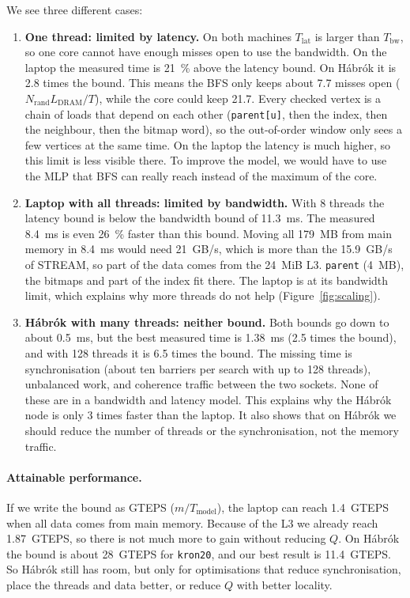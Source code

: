 We see three different cases:
\begin{enumerate}
  \item \textbf{One thread: limited by latency.} On both machines $T_\text{lat}$ is larger than
        $T_\text{bw}$, so one core cannot have enough misses open to use the bandwidth. On
        the laptop the measured time is \SI{21}{\percent} above the latency bound. On Hábrók it
        is 2.8 times the bound. This means the BFS only keeps about 7.7 misses open
        ($N_\text{rand} L_\text{DRAM} / T$), while the core could keep 21.7. Every checked
        vertex is a chain of loads that depend on each other (\texttt{parent[u]}, then the
        index, then the neighbour, then the bitmap word), so the out-of-order window only sees
        a few vertices at the same time. On the laptop the latency is much higher, so this
        limit is less visible there. To improve the model, we would have to use the MLP that
        BFS can really reach instead of the maximum of the core.
  \item \textbf{Laptop with all threads: limited by bandwidth.} With 8 threads the latency
        bound is below the bandwidth bound of \SI{11.3}{ms}. The measured \SI{8.4}{ms} is even
        \SI{26}{\percent} faster than this bound. Moving all \SI{179}{MB} from main memory in
        \SI{8.4}{ms} would need \SI{21}{GB/s}, which is more than the \SI{15.9}{GB/s} of
        STREAM, so part of the data comes from the \SI{24}{MiB} L3. \texttt{parent}
        (\SI{4}{MB}), the bitmaps and part of the index fit there. The laptop is at its
        bandwidth limit, which explains why more threads do not help
        (Figure~\ref{fig:scaling}).
  \item \textbf{Hábrók with many threads: neither bound.} Both bounds go down to about
        \SI{0.5}{ms}, but the best measured time is \SI{1.38}{ms} (2.5 times the bound), and
        with 128 threads it is 6.5 times the bound. The missing time is synchronisation
        (about ten barriers per search with up to 128 threads), unbalanced work, and coherence
        traffic between the two sockets. None of these are in a bandwidth and latency model.
        This explains why the Hábrók node is only 3 times faster than the laptop. It also
        shows that on Hábrók we should reduce the number of threads or the synchronisation,
        not the memory traffic.
\end{enumerate}

\paragraph{Attainable performance.} If we write the bound as GTEPS ($m/T_\text{model}$), the
laptop can reach \SI{1.4}{GTEPS} when all data comes from main memory. Because of the L3 we
already reach \SI{1.87}{GTEPS}, so there is not much more to gain without reducing $Q$. On
Hábrók the bound is about \SI{28}{GTEPS} for \texttt{kron20}, and our best result is
\SI{11.4}{GTEPS}. So Hábrók still has room, but only for optimisations that reduce
synchronisation, place the threads and data better, or reduce $Q$ with better locality.
